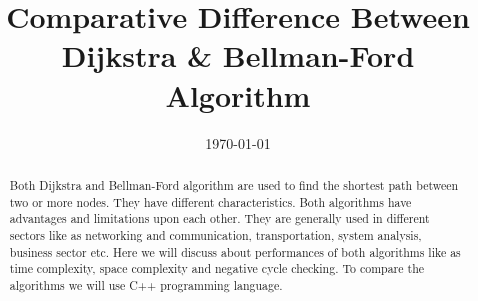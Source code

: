 \documentclass[a4paper,10pt]{article}
\title{Comparative Difference Between Dijkstra \& Bellman-Ford Algorithm}
\date{\today}
\begin{document}
\maketitle

\begin{abstract}
Both Dijkstra and Bellman-Ford algorithm are used to find the shortest path between two or more nodes. They have different characteristics. Both algorithms have advantages and limitations upon each other. They are generally used in different sectors like as networking and communication, transportation, system analysis, business sector etc. Here we will discuss about performances of both algorithms like as time complexity, space complexity and negative cycle checking. To compare the algorithms we will use C++ programming language.
   \end{abstract}
\end{document}
